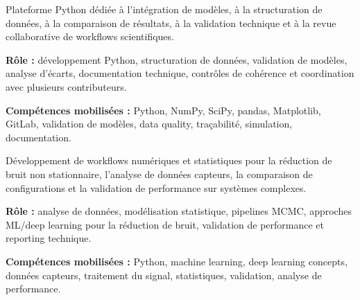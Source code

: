 \documentclass[8pt,a4paper,ragged2e,withhyper]{altacv}
\begin{document}
Plateforme Python dédiée à l’intégration de modèles, à la structuration de données, à la comparaison de résultats, à la validation technique et à la revue collaborative de workflows scientifiques.

\textbf{Rôle :} développement Python, structuration de données, validation de modèles, analyse d’écarts, documentation technique, contrôles de cohérence et coordination avec plusieurs contributeurs.

\textbf{Compétences mobilisées :} Python, NumPy, SciPy, pandas, Matplotlib, GitLab, validation de modèles, data quality, traçabilité, simulation, documentation.

\divider


Développement de workflows numériques et statistiques pour la réduction de bruit non stationnaire, l’analyse de données capteurs, la comparaison de configurations et la validation de performance sur systèmes complexes.

\textbf{Rôle :} analyse de données, modélisation statistique, pipelines MCMC, approches ML/deep learning pour la réduction de bruit, validation de performance et reporting technique.

\textbf{Compétences mobilisées :} Python, machine learning, deep learning concepts, données capteurs, traitement du signal, statistiques, validation, analyse de performance.


\vspace{-.3cm}


{\small
{}
}

\divider\smallskip
\vspace{-.3cm}


{\small
{}
}
\end{document}
